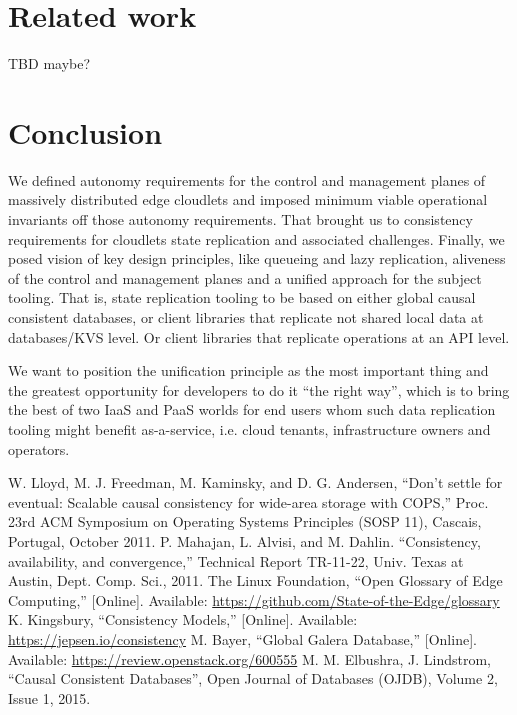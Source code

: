 \documentclass[conference]{IEEEtran}
\begin{document}
\section{Related work}

TBD maybe?

\section{Conclusion}

We defined autonomy requirements for the control and management planes of
massively distributed edge cloudlets and imposed minimum viable operational
invariants off those autonomy requirements. That brought us to consistency
requirements for cloudlets state replication and associated challenges.
Finally, we posed vision of key design principles, like queueing and lazy
replication, aliveness of the control and management planes and a unified
approach for the subject tooling. That is, state replication tooling to be
based on either global causal consistent databases, or client libraries that
replicate not shared local data at databases/KVS level. Or client libraries that
replicate operations at an API level.

We want to position the unification principle as the most important thing and the
greatest opportunity for developers to do it ``the right way'', which is to bring the best of
two IaaS and PaaS worlds for end users whom such data replication tooling might
benefit as-a-service, i.e. cloud tenants, infrastructure owners and operators.

\begin{thebibliography}{00}
 W. Lloyd, M. J. Freedman, M. Kaminsky, and D. G. Andersen, ``Don’t settle for eventual: Scalable causal consistency for wide-area storage with COPS,'' Proc. 23rd ACM Symposium on Operating Systems Principles (SOSP 11), Cascais, Portugal, October 2011.
 P. Mahajan, L. Alvisi, and M. Dahlin. ``Consistency, availability, and convergence,'' Technical Report TR-11-22, Univ. Texas at Austin, Dept. Comp. Sci., 2011.
 The Linux Foundation, ``Open Glossary of Edge Computing,'' [Online]. Available: \url{https://github.com/State-of-the-Edge/glossary}
 K. Kingsbury, ``Consistency Models,'' [Online]. Available: \url{https://jepsen.io/consistency}
 M. Bayer, ``Global Galera Database,'' [Online]. Available: \url{https://review.openstack.org/600555}
 M. M. Elbushra, J. Lindstrom, ``Causal Consistent Databases'', Open Journal of Databases (OJDB), Volume 2, Issue 1, 2015.
\end{thebibliography}
\end{document}
